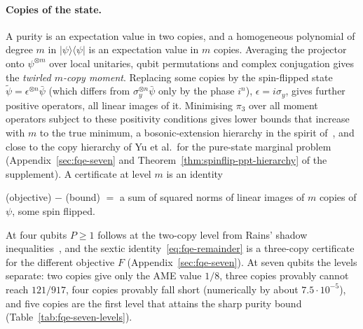 \paragraph{Copies of the state.} A purity is an expectation value in two copies, and a homogeneous polynomial of
degree $m$ in $|\psi\rangle\langle\psi|$ is an expectation value in $m$ copies. Averaging the projector onto
$\psi^{\otimes m}$ over local unitaries, qubit permutations and complex conjugation gives the \emph{twirled $m$-copy
moment}. Replacing some copies by the spin-flipped state $\tilde\psi=\epsilon^{\otimes n}\bar\psi$ (which differs from $\sigma_y^{\otimes n}\bar\psi$ only by the phase $i^n$),
$\epsilon=i\sigma_y$, gives further positive operators, all linear images of it. Minimising $\pi_3$ over all moment operators subject to these positivity conditions gives lower bounds
that increase with $m$ to the true minimum, a bosonic-extension hierarchy in the spirit of~\cite{DPS}, and close to the copy hierarchy of Yu et al.\ for the pure-state
marginal problem~\cite{YSWNG} (Appendix~\ref{sec:fqe-seven} and Theorem~\ref{thm:spinflip-ppt-hierarchy} of
the supplement). A certificate at level $m$ is an identity
\begin{center}
(objective) $-$ (bound) $=$ a sum of squared norms of linear images of $m$ copies of $\psi$, some spin flipped.
\end{center}
At four qubits $P\ge1$ follows at the two-copy level from Rains' shadow inequalities~\cite{Rains}, and the sextic
identity~\eqref{eq:fqe-remainder} is a three-copy certificate for the different objective $F$ (Appendix~\ref{sec:fqe-seven}). At seven qubits the levels separate: two copies give only the AME value $1/8$, three copies
provably cannot reach $121/917$, four copies provably fall short (numerically by about $7.5\cdot10^{-5}$), and five copies are the first level that attains the sharp purity bound
(Table~\ref{tab:fqe-seven-levels}).

